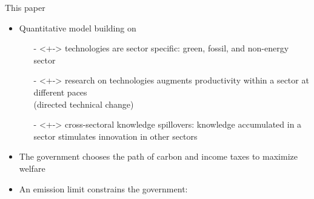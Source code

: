 \documentclass[11pt,aspectratio=169]{beamer}
\begin{document}
\begin{frame}{This paper}
	\vspace{-1mm}
	\begin{itemize}
		\item<+-> Quantitative model building on \cite{Fried2018ClimateAnalysis} 
		\vspace{2mm}
		\begin{itemize}
			\item[-]<+-> \alert{technologies are sector specific}: green, fossil, and non-energy sector 
			\vspace{1mm}
			\item[-]<+-> \alert{research} on technologies augments productivity within a sector at different paces\\ \footnotesize{(directed technical change) }
			\vspace{1mm}
			\item[-]<+-> \alert{cross-sectoral knowledge spillovers}: knowledge accumulated in a sector stimulates innovation in other sectors %
		\end{itemize}
		\vspace{2mm}
		\item<+->   The government   chooses the \alert{path of carbon and income taxes} to maximize welfare\vspace{2mm}
		\item<+-> An \alert{emission limit} constrains the government: 
	\end{itemize}
	\pause
	\vspace{0mm}
	\centering
\end{frame}
\end{document}
